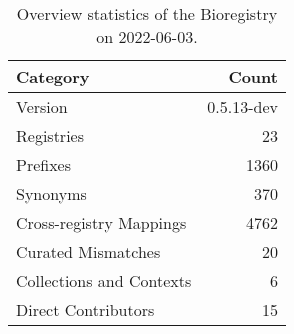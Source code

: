 \begin{table}
\centering
\caption{Overview statistics of the Bioregistry on 2022-06-03.}
\label{tab:bioregistry-summary}
\begin{tabular}{lr}
\toprule
                Category &      Count \\
\midrule
                 Version & 0.5.13-dev \\
              Registries &         23 \\
                Prefixes &       1360 \\
                Synonyms &        370 \\
 Cross-registry Mappings &       4762 \\
      Curated Mismatches &         20 \\
Collections and Contexts &          6 \\
     Direct Contributors &         15 \\
\bottomrule
\end{tabular}
\end{table}

